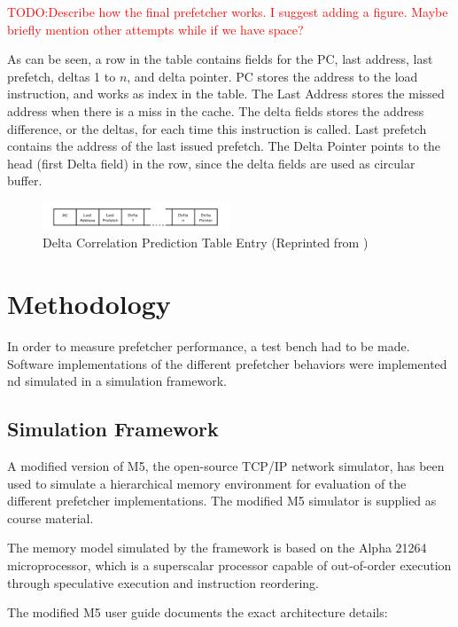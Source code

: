 \documentclass[a4paper]{IEEEtran}
\newcommand\TODO[1]{\textcolor{red}{TODO:#1}}
\newcommand\todo[1]{\TODO{#1}}
\begin{document}
\todo{Describe how the final prefetcher works. I suggest adding a figure. Maybe briefly mention other attempts while if we have space?}


As can be seen, a row in the table contains fields for the PC, last address, last prefetch, deltas 1 to $ n $, and delta pointer.
PC stores the address to the load instruction, and works as index in the table.
The Last Address stores the missed address when there is a miss in the cache.
The delta fields stores the address difference, or the deltas, for each time this instruction is called.
Last prefetch contains the address of the last issued prefetch.
The Delta Pointer points to the head (first Delta field) in the row, since the delta fields are used as circular buffer.

\begin{figure}[h!]
  \centering
      \includegraphics[width=0.5\textwidth]{Figures/DCTable}
  \caption{Delta Correlation Prediction Table Entry (Reprinted from \protect\cite{dcpt})}
  \label{fig:DCTable}
\end{figure}

\section{Methodology}

In order to measure prefetcher performance, a test bench had to be made.
Software implementations of the different prefetcher behaviors were implemented nd simulated in a simulation framework.

\subsection{Simulation Framework}

A modified version of M5, the open-source TCP/IP network simulator\cite{M5paper}, has been used to simulate a hierarchical memory environment for evaluation of the different prefetcher implementations.
The modified M5 simulator is supplied as course material.

The memory model simulated by the framework is based on the Alpha 21264 microprocessor, which is a superscalar processor capable of out-of-order execution through speculative execution and instruction reordering.

The modified M5 user guide documents the exact architecture details:
\end{document}
